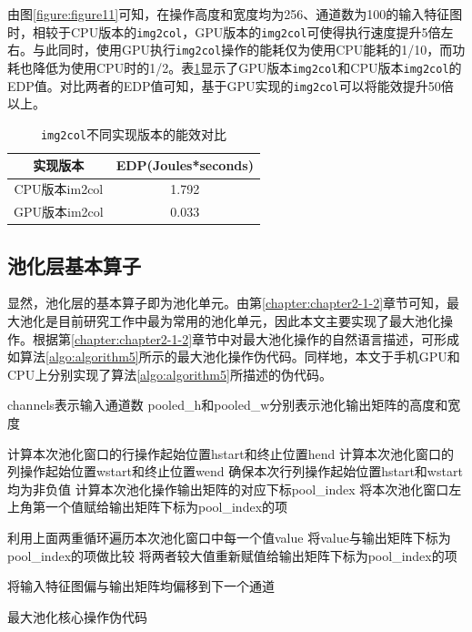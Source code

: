由图\ref{figure:figure11}可知，在操作高度和宽度均为256、通道数为100的输入特征图时，相较于CPU版本的\texttt{img2col}，GPU版本的\texttt{img2col}可使得执行速度提升5倍左右。与此同时，使用GPU执行\texttt{img2col}操作的能耗仅为使用CPU能耗的1/10，而功耗也降低为使用CPU时的1/2。表\ref{table:table2}显示了GPU版本\texttt{img2col}和CPU版本\texttt{img2col}的EDP值。对比两者的EDP值可知，基于GPU实现的\texttt{img2col}可以将能效提升50倍以上。

\begin{table}[htbp]
  \centering
  \caption{\texttt{img2col}不同实现版本的能效对比}
  \label{table:table2}
  \begin{tabular}{cc}
    \toprule
      实现版本 & EDP(Joules*seconds) \\
    \midrule
      CPU版本im2col & 1.792 \\
      GPU版本im2col & 0.033 \\
    \bottomrule
  \end{tabular}
\end{table}


\subsection{池化层基本算子}

显然，池化层的基本算子即为池化单元。由第\ref{chapter:chapter2-1-2}章节可知，最大池化是目前研究工作中最为常用的池化单元，因此本文主要实现了最大池化操作。根据第\ref{chapter:chapter2-1-2}章节中对最大池化操作的自然语言描述，可形成如算法\ref{algo:algorithm5}所示的最大池化操作伪代码。同样地，本文于手机GPU和CPU上分别实现了算法\ref{algo:algorithm5}所描述的伪代码。

\begin{algorithm}[htbp]
  \small
  \SetAlgoLined
    \begin{spacing}{0.8}
    channels表示输入通道数\;
    pooled\_h和pooled\_w分别表示池化输出矩阵的高度和宽度\;
     {
         {
             {
                计算本次池化窗口的行操作起始位置hstart和终止位置hend\;
                计算本次池化窗口的列操作起始位置wstart和终止位置wend\;
                确保本次行列操作起始位置hstart和wstart均为非负值\;
                计算本次池化操作输出矩阵的对应下标pool\_index\;
                将本次池化窗口左上角第一个值赋给输出矩阵下标为pool\_index的项\;

                 {
                     {
                      利用上面两重循环遍历本次池化窗口中每一个值value\;
                        将value与输出矩阵下标为pool\_index的项做比较\;
                      将两者较大值重新赋值给输出矩阵下标为pool\_index的项\;
                    }
                }
            }
        }
        将输入特征图偏与输出矩阵均偏移到下一个通道\;
    }
    \end{spacing}
  \caption{最大池化核心操作伪代码}
  \label{algo:algorithm5}
\end{algorithm}

